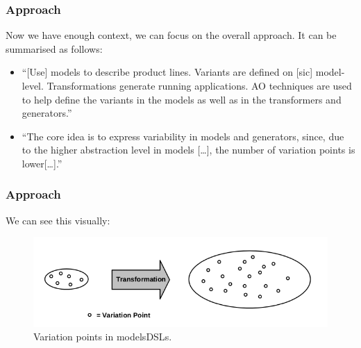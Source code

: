 \documentclass{beamer}
\begin{document}
\begin{frame}
\frametitle{Approach}

Now we have enough context, we can focus on the overall approach. It
can be summarised as follows:

\pause{}

\begin{itemize}

\item \enquote{[Use] models to describe product lines. Variants are
  defined on [sic] model-level.  Transformations generate running
  applications. \acf{AO} techniques are used to help define the
  variants in the models as well as in the transformers and
  generators.}\cite{voelter2007handling}

  \pause{}

\item \enquote{The core idea is to express variability in models and
  generators, since, due to the higher abstraction level in models
  [\ldots], the number of variation points is
  lower[\ldots].}\cite{voelter2007handling}

\end{itemize}

\end{frame}

\begin{frame}
\frametitle{Approach}

We can see this visually:

\begin{figure}
  \centering
  \includegraphics[scale=0.5]{images/variation_point_voelter.png}
  \caption{Variation points in
    models\ac{DSL}s.\cite{voelter2007handling}}
\end{figure}

\end{frame}
\end{document}
